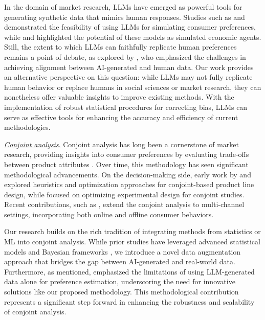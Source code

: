 In the domain of market research, LLMs have emerged as powerful tools for generating synthetic data that mimics human responses. Studies such as \cite{brand2023using} and \cite{argyle2023out} demonstrated the feasibility of using LLMs for simulating consumer preferences, while \cite{chen2023emergence} and \cite{horton2023large} highlighted the potential of these models as simulated economic agents. Still, the extent to which LLMs can faithfully replicate human preferences remains a point of debate, as explored by \cite{goli2024frontiers}, who emphasized the challenges in achieving alignment between AI-generated and human data.
Our work provides an alternative perspective on this question: while LLMs may not fully replicate human behavior or replace humans in social sciences or market research, they can nonetheless offer valuable insights to improve existing methods. With the implementation of robust statistical procedures for correcting bias, LLMs can serve as effective tools for enhancing the accuracy and efficiency of current methodologies.


\vspace{1mm}
\noindent
\noindent
\underline{\textit{Conjoint analysis}.}
Conjoint analysis has long been a cornerstone of market research, providing insights into consumer preferences by evaluating trade-offs between product attributes \citep{green1978conjoint, green1990conjoint}. Over time, this methodology has seen significant methodological advancements. On the decision-making side, early work by \cite{kohli1990heuristics} and \cite{wang2009branch} explored heuristics and optimization approaches for conjoint-based product line design, while \cite{kessels2008optimal} focused on optimizing experimental design for conjoint studies. Recent contributions, such as \cite{dzyabura2018offline}, extend the conjoint analysis to multi-channel settings, incorporating both online and offline consumer behaviors.

Our research builds on the rich tradition of integrating methods from statistics or ML into conjoint analysis. While prior studies have leveraged advanced statistical models \citep{allenby2006hierarchical} and Bayesian frameworks \citep{eggers2021choice}, we introduce a novel data augmentation approach that bridges the gap between AI-generated and real-world data. Furthermore, as mentioned, \cite{goli2024frontiers} emphasized the limitations of using LLM-generated data alone for preference estimation, underscoring the need for innovative solutions like our proposed methodology. This methodological contribution represents a significant step forward in enhancing the robustness and scalability of conjoint analysis.

